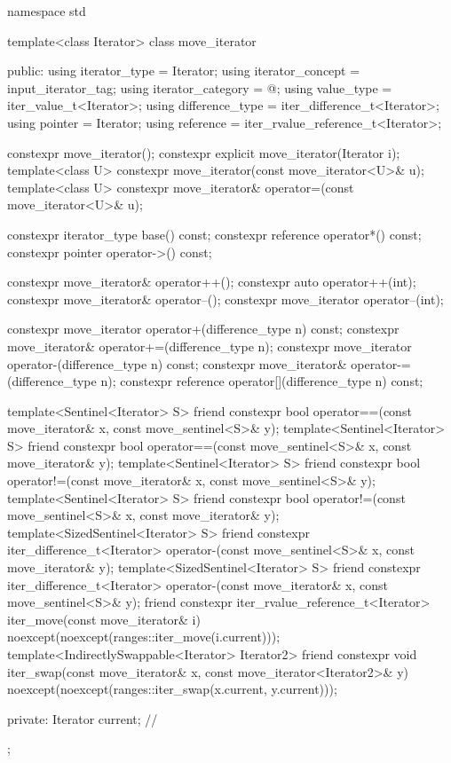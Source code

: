%
\begin{codeblock}
namespace std {
  template<class Iterator>
  class move_iterator {
  public:
    using iterator_type     = Iterator;
    using iterator_concept  = input_iterator_tag;
    using iterator_category = @\seebelow@;
    using value_type        = iter_value_t<Iterator>;
    using difference_type   = iter_difference_t<Iterator>;
    using pointer           = Iterator;
    using reference         = iter_rvalue_reference_t<Iterator>;

    constexpr move_iterator();
    constexpr explicit move_iterator(Iterator i);
    template<class U> constexpr move_iterator(const move_iterator<U>& u);
    template<class U> constexpr move_iterator& operator=(const move_iterator<U>& u);

    constexpr iterator_type base() const;
    constexpr reference operator*() const;
    constexpr pointer operator->() const;

    constexpr move_iterator& operator++();
    constexpr auto operator++(int);
    constexpr move_iterator& operator--();
    constexpr move_iterator operator--(int);

    constexpr move_iterator operator+(difference_type n) const;
    constexpr move_iterator& operator+=(difference_type n);
    constexpr move_iterator operator-(difference_type n) const;
    constexpr move_iterator& operator-=(difference_type n);
    constexpr reference operator[](difference_type n) const;

    template<Sentinel<Iterator> S>
      friend constexpr bool
        operator==(const move_iterator& x, const move_sentinel<S>& y);
    template<Sentinel<Iterator> S>
      friend constexpr bool
        operator==(const move_sentinel<S>& x, const move_iterator& y);
    template<Sentinel<Iterator> S>
      friend constexpr bool
        operator!=(const move_iterator& x, const move_sentinel<S>& y);
    template<Sentinel<Iterator> S>
      friend constexpr bool
        operator!=(const move_sentinel<S>& x, const move_iterator& y);
    template<SizedSentinel<Iterator> S>
      friend constexpr iter_difference_t<Iterator>
        operator-(const move_sentinel<S>& x, const move_iterator& y);
    template<SizedSentinel<Iterator> S>
      friend constexpr iter_difference_t<Iterator>
        operator-(const move_iterator& x, const move_sentinel<S>& y);
    friend constexpr iter_rvalue_reference_t<Iterator>
      iter_move(const move_iterator& i)
        noexcept(noexcept(ranges::iter_move(i.current)));
    template<IndirectlySwappable<Iterator> Iterator2>
      friend constexpr void
        iter_swap(const move_iterator& x, const move_iterator<Iterator2>& y)
          noexcept(noexcept(ranges::iter_swap(x.current, y.current)));

  private:
    Iterator current;   // \expos
  };
}
\end{codeblock}

